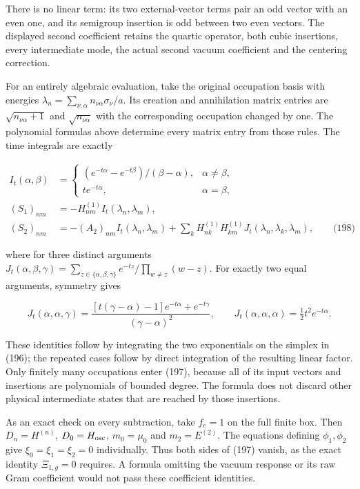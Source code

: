There is no linear term: its two external-vector terms pair an odd
vector with an even one, and its semigroup insertion is odd between two
even vectors. The displayed second coefficient retains the quartic
operator, both cubic insertions, every intermediate mode, the actual
second vacuum coefficient and the centering correction.

For an entirely algebraic evaluation, take the original occupation basis
with energies \(\lambda_n=\sum_{\nu,\alpha}n_{\nu\alpha}
\sigma_\nu/a\). Its creation and annihilation matrix entries are
\(\sqrt{n_{\nu\alpha}+1}\) and \(\sqrt{n_{\nu\alpha}}\) with the
corresponding occupation changed by one. The polynomial formulas above
determine every matrix entry from those rules. The time integrals are
exactly

\[
\begin{aligned}
 I_t(\alpha,\beta)&=
 \begin{cases}(e^{-t\alpha}-e^{-t\beta})/(\beta-\alpha),&\alpha\ne\beta,\\
 t e^{-t\alpha},&\alpha=\beta,
 \end{cases}\\
 (S_1)_{nm}&=-H^{(1)}_{nm}I_t(\lambda_n,\lambda_m),\\
 (S_2)_{nm}&=-(A_2)_{nm}I_t(\lambda_n,\lambda_m)
       +\sum_kH^{(1)}_{nk}H^{(1)}_{km}
                      J_t(\lambda_n,\lambda_k,\lambda_m),
       \qquad\text{(198)}
\end{aligned}
\]

where for three distinct arguments \(J_t(\alpha,\beta,\gamma)=
\sum_{z\in\{\alpha,\beta,\gamma\}}
e^{-tz}/\prod_{w\ne z}(w-z)\). For exactly two equal arguments, symmetry
gives

\[
J_t(\alpha,\alpha,\gamma)=
 \frac{[t(\gamma-\alpha)-1]e^{-t\alpha}+e^{-t\gamma}}
                  {(\gamma-\alpha)^2},\qquad
 J_t(\alpha,\alpha,\alpha)=\tfrac12t^2e^{-t\alpha}.
\]

These identities follow by integrating the two exponentials on the
simplex in (196); the repeated cases follow by direct integration of the
resulting linear factor. Only finitely many occupations enter (197),
because all of its input vectors and insertions are polynomials of
bounded degree. The formula does not discard other physical intermediate
states that are reached by those insertions.

As an exact check on every subtraction, take \(f_e=1\) on the full
finite box. Then \(D_n=H^{(n)}\), \(D_0=H_{\rm osc}\), \(m_0=\mu_0\) and
\(m_2=E^{(2)}\). The equations defining \(\phi_1,\phi_2\) give
\(\xi_0=\xi_1=\xi_2=0\) individually. Thus both sides of (197) vanish,
as the exact identity \(\Xi_{1,g}=0\) requires. A formula omitting the
vacuum response or its raw Gram coefficient would not pass these
coefficient identities.

